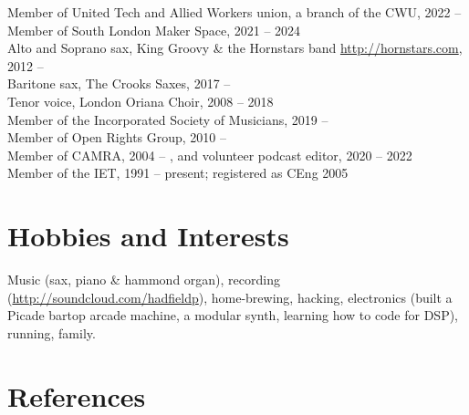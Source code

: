 \documentclass[line]{resume}
\begin{document}
\begin{resume}
    Member of United Tech and Allied Workers union, a branch of the CWU, 2022 --                            \vspace{0.5mm}\\%
    Member of South London Maker Space, 2021 -- 2024                                                        \vspace{0.5mm}\\%
    Alto and Soprano sax, King Groovy \& the Hornstars band \url{http://hornstars.com}, 2012 --             \vspace{0.5mm}\\%
    Baritone sax, The Crooks Saxes, 2017 --                                                                 \vspace{0.5mm}\\%
    Tenor voice, London Oriana Choir, 2008 -- 2018                                                          \vspace{0.5mm}\\%
    Member of the Incorporated Society of Musicians, 2019 --                                                \vspace{0.5mm}\\%
    Member of Open Rights Group, 2010 --                                                                    \vspace{0.5mm}\\%
    Member of CAMRA, 2004 -- , and volunteer podcast editor, 2020 -- 2022                                   \vspace{0.5mm}\\%
    Member of the IET, 1991 -- present; registered as CEng 2005

    \section{\mysidestyle Hobbies and Interests}

    Music (sax, piano \& hammond organ), recording (\url{http://soundcloud.com/hadfieldp}), home-brewing, hacking,
    electronics (built a Picade bartop arcade machine, a modular synth, learning how to code for DSP), running, family.

    \section{\mysidestyle References}


\end{resume}
\end{document}
